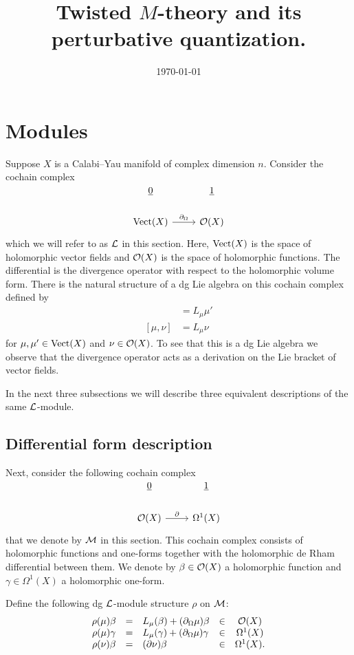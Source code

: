 \documentclass[11pt]{amsart}
\date{\today}
\title{Twisted \(M\)-theory and its perturbative quantization.}
\def\Vect{{\rm Vect}}
\begin{document}
\section{Modules}
Suppose $X$ is a Calabi--Yau manifold of complex dimension $n$. 
Consider the cochain complex
\[
\begin{tikzcd}
\ul{0} & \ul{1} \\
\Vect(X) \ar[r, "\partial_\Omega"] & \cO (X) 
\end{tikzcd}
\]
which we will refer to as $\mathcal L$ in this section.
Here, $\Vect(X)$ is the space of holomorphic vector fields and $\mathcal O(X)$ is the space of holomorphic functions.
The differential is the divergence operator with respect to the holomorphic volume form.
There is the natural structure of a dg Lie algebra on this cochain complex defined by
\begin{align*}
[\mu, \mu'] & = L_\mu \mu' \\
[\mu, \nu] & = L_\mu \nu 
\end{align*}
for $\mu,\mu' \in \Vect(X)$ and $\nu \in \mathcal O(X)$. 
To see that this is a dg Lie algebra we observe that the divergence operator acts as a derivation on the Lie bracket of vector fields. 

In the next three subsections we will describe three equivalent descriptions of the same $\mathcal L$-module.

\subsection{Differential form description}

Next, consider the following cochain complex 
\[
\begin{tikzcd}
\ul{0} & \ul{1} \\
\cO(X) \ar[r, "\partial"] & \Omega^1 (X) 
\end{tikzcd}
\]
that we denote by $\mathcal M$ in this section. 
This cochain complex consists of holomorphic functions and one-forms together with the holomorphic de Rham differential between them. 
We denote by $\beta \in \mathcal O(X)$ a holomorphic function and $\gamma \in \Omega^1(X)$ a holomorphic one-form.

\begin{dfn}
Define the following dg $\mathcal L$-module structure $\rho$ on $\mathcal M$:
\[
\begin{array}{cclcc}
\rho (\mu) \beta & = & L_\mu(\beta) + (\partial_\Omega \mu) \beta & \in &\mathcal O(X) \\
\rho (\mu) \gamma & = & L_\mu (\gamma) + (\partial_\Omega \mu) \gamma & \in &\Omega^1(X) \\ 
\rho(\nu) \beta & = & (\partial \nu) \beta & \in & \Omega^1(X) .
\end{array}
\]
\end{dfn}
\end{document}
